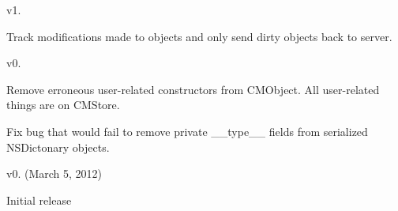 v1.
\begin{DoxyItemize}
\item Track modifications made to objects and only send dirty objects back to server.
\end{DoxyItemize}

v0.
\begin{DoxyItemize}
\item Remove erroneous user-\/related constructors from C\-M\-Object. All user-\/related things are on C\-M\-Store.
\item Fix bug that would fail to remove private {\ttfamily \-\_\-\-\_\-type\-\_\-\-\_\-} fields from serialized N\-S\-Dictonary objects.
\end{DoxyItemize}

v0. (March 5, 2012)
\begin{DoxyItemize}
\item Initial release 
\end{DoxyItemize}